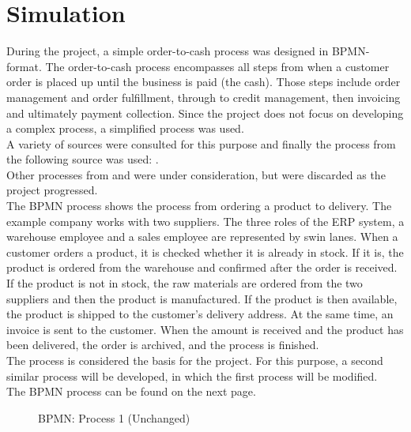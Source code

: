     \section{Simulation}
    During the project, a simple order-to-cash process was designed in BPMN-format. The order-to-cash process encompasses all steps from when a customer order is placed up until the business is paid (the cash). Those steps include order management and order fulfillment, through to credit management, then invoicing and ultimately payment collection. Since the project does not focus on developing a complex process, a simplified process was used.\\
    A variety of sources were consulted for this purpose and finally the process from the following source was used: \cite[][373]{madu2018}.\\
    Other processes from \cite[][251]{dafi2020} and \cite[][353]{duer2017} were under consideration, but were discarded as the project progressed.\\
    The BPMN process shows the process from ordering a product to delivery. The example company works with two suppliers. The three roles of the ERP system, a warehouse employee and a sales employee are represented by swin lanes. When a customer orders a product, it is checked whether it is already in stock. If it is, the product is ordered from the warehouse and confirmed after the order is received. If the product is not in stock, the raw materials are ordered from the two suppliers and then the product is manufactured. If the product is then available, the product is shipped to the customer's delivery address. At the same time, an invoice is sent to the customer. When the amount is received and the product has been delivered, the order is archived, and the process is finished.\\    
    The process is considered the basis for the project. For this purpose, a second similar process will be developed, in which the first process will be modified.\\
    The BPMN process can be found on the next page.
    \begin{figure}[H]
        \centering
        \caption{BPMN: Process 1 (Unchanged)}
        \label{bpmn1}
    \end{figure}
